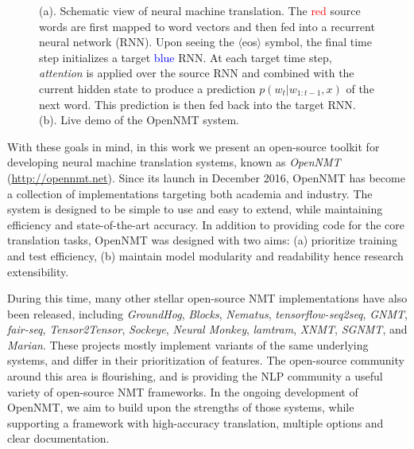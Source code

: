 \documentclass[]{article}
\begin{document}
\begin{figure}[t]
  \centering
  \vspace{-0.3cm}
  \caption{\small (a). Schematic view of neural machine translation. The \textcolor{red}{red} source words are first mapped to word vectors and then fed into a recurrent neural network (RNN). Upon seeing the $\langle$eos$\rangle$ symbol, the final time step initializes a target \textcolor{blue}{blue} RNN. At each target time step, \textit{attention} is applied over the source RNN and combined with the current hidden state to produce a prediction $p(w_t| w_{1: t-1}, x)$ of the next word. This prediction is then fed back into the target RNN. (b). Live demo of the OpenNMT system.}
  \vspace {-0.5cm}
  \label{fig:ab}
\end{figure}

With these goals in mind, in this work we present an open-source toolkit for developing
neural machine translation systems, known as \textit{OpenNMT} (\url{http://opennmt.net}). Since its launch in December 2016, OpenNMT has become a collection of implementations targeting both academia and industry. The system is designed to be simple to use and easy to extend, while maintaining efficiency and state-of-the-art accuracy. In
addition to providing code for the core translation tasks, OpenNMT was
designed with two aims: (a) prioritize training and test
efficiency, (b) maintain model modularity and readability hence research extensibility.

During this time, many other stellar open-source NMT implementations
have also been released, including \textit{GroundHog},
\textit{Blocks}, \textit{Nematus}, \textit{tensorflow-seq2seq},
\textit{GNMT}, \textit{fair-seq},  \textit{Tensor2Tensor}, \textit{Sockeye},
\textit{Neural Monkey}, \textit{lamtram}, \textit{XNMT},
\textit{SGNMT}, and \textit{Marian}. These projects mostly implement
variants of the same underlying systems, and differ in their
prioritization of features. The open-source community around
this area is flourishing, and is providing the NLP community a useful variety of open-source NMT frameworks.
In the ongoing development of OpenNMT, we aim to build upon the
strengths of those systems, while supporting a framework with
high-accuracy translation, multiple options and clear documentation.
\end{document}
